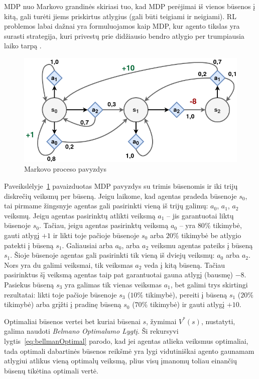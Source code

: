 \documentclass{VUMIFPSbakalaurinis}
\begin{document}
{	MDP nuo Markovo grandinės skiriasi tuo, kad MDP perėjimai iš vienos būsenos į kitą, gali turėti jiems priskirtus atlygius (gali būti teigiami ir neigiami). RL problemos labai dažnai yra formuluojamos kaip MDP, kur agento tikslas yra surasti strategija, kuri privestų prie didžiausio bendro atlygio per trumpiausia laiko tarpą \cite{handson}.\par
	
	\begin{figure}[H]
		\centering
		\includegraphics[scale=0.33]{img/mdp}
		\caption{Markovo proceso pavyzdys}
		\label{img:mdp}
	\end{figure} 
	
	Paveikslėlyje~\ref{img:mdp} pavaizduotas MDP pavyzdys su trimis būsenomis ir iki trijų diskrečių veiksmų per būseną. Jeigu laikome, kad agentas pradeda būsenoje \(s_0\), tai pirmame žingsnyje agentas gali pasirinkti vieną iš trijų galimų: \(a_0\), \(a_1\), \(a_2\) veiksmų. Jeigu agentas pasirinktų atlikti veiksmą \(a_1\) -- jis garantuotai liktų būsenoje \(s_0\). Tačiau, jeigu agentas pasirinktų veiksmą \(a_0\) -- yra \(80\%\) tikimybė, gauti atlygį \(+1\) ir likti toje pačioje būsenoje \(s_0\) arba \(20\%\) tikimybė be atlygio patekti į būseną \(s_1\). Galiausiai arba \(a_0\), arba \(a_2\) veiksmu agentas pateiks į būseną \(s_1\). Šioje būsenoje agentas gali pasirinkti tik vieną iš dviejų veiksmų: \(a_0\) arba \(a_2\). Nors yra du galimi veiksmai, tik veiksmas \(a_2\) veda į kitą būseną. Tačiau pasirinktus šį veiksmą agentas taip pat garantuotai gauna atlygį (bausmę) \(-8\). Pasiekus būseną \(s_3\) yra galimas tik vienas veiksmas \(a_1\), bet galimi trys skirtingi rezultatai: likti toje pačioje būsenoje \(s_3\) (\(10\%\) tikimybė), pereiti į būseną \(s_1\) (\(20\%\) tikimybė) arba grįžti į pradinę būseną \(s_0\) (\(70\%\) tikimybė) ir gauti atlygį \(+10\).\par
	
	Optimaliai būsenos vertei bet kuriai būsenai \(s\), žymimai \(V^*(s)\), nustatyti, galima naudoti \textit{Belmano Optimalumo Lygtį}. Ši rekursyvi lygtis~\ref{eq:bellmanOptimal} parodo, kad jei agentas atlieka veiksmus optimaliai, tada optimali dabartinės būsenos reikšmė yra lygi vidutiniškai agento gaunamam atlygiui atlikus vieną optimalų veiksmą, plius visų įmanomų toliau einančių būsenų tikėtina optimali vertė.
	
}
\end{document}
